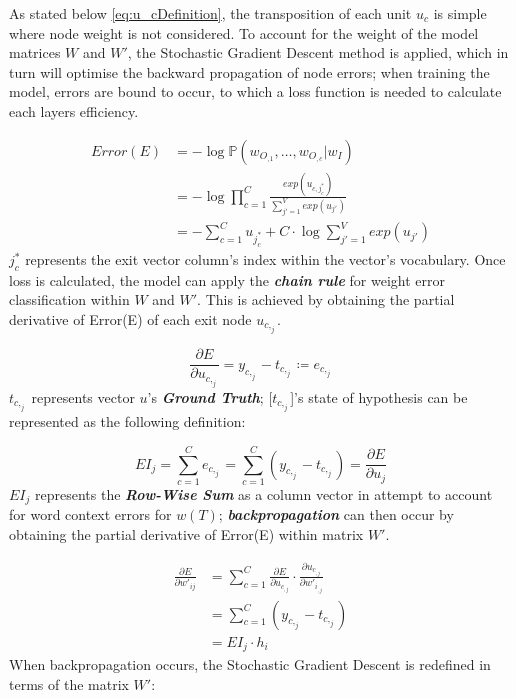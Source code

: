 As stated below \autoref{eq:u_cDefinition}, the transposition of each unit $u_{c}$ is simple where node weight is not considered. To account for the weight of the model matrices $W$ and $W'$, the Stochastic Gradient Descent method is applied, which in turn will optimise the backward propagation of node errors; when training the model, errors are bound to occur, to which a loss function is needed to calculate each layers efficiency.

\begin{equation}
    \begin{split}
        Error (E) & = - \log \mathbb{P} (w_{O_,{_1}} , \ldots, w_{O_{,c}} | w_{I}) \\
                  & = - \log \prod_{c=1}^{C} \frac{exp(u_{c,j_{c}^{*}})}{\sum_{j'=1}^{V} exp(u_{j'})}  \\
                  & = - \sum_{c=1}^{C} u_{j_{c}^{*}} + C \cdot \log \sum_{j'=1} ^ {V} exp(u_{j'})
    \end{split}
\end{equation}
${j_{c}^{*}}$ represents the exit vector column's index within the vector's vocabulary. Once loss is calculated, the model can apply the \textbf{\textit{chain rule}} for weight error classification within $W$ and $W'$. This is achieved by obtaining the partial derivative of Error(E) of each exit node $u_{c,_j}$.

\begin{equation}
    \frac{\partial E}{\partial u_{c,_j}} = y_{c,_j} - t_{c,_j} \coloneqq e_{c,_j}
\end{equation}
$t_{c,_j}$ represents vector $u$'s \textbf{\textit{Ground Truth}}; [$t_{c,_j}$]'s state of hypothesis can be represented as the following definition:

\begin{equation}
    EI_j = \sum_{c=1}^{C} e_{c,_j} = \sum_{c=1}^{C} (y_{c,_j} - t_{c,_j}) = \frac{\partial E}{\partial u_{j}}
\end{equation}
$EI_{j}$ represents the \textbf{\textit{Row-Wise Sum}} as a column vector in attempt to account for word context errors for $w(T)$; \textbf{\textit{backpropagation}} can then occur by obtaining the partial derivative of Error(E) within matrix $W'$.

\begin{equation} \label{}
    \begin{split}
        \frac{\partial E}{\partial w'_{ij}} & = \sum_{c=1}^{C} \frac{\partial E}{\partial u_{c_{,j}}} \cdot \frac{\partial u_{c_{,j}}}{\partial w'_{i_{,j}}} \\
                                            & = \sum_{c=1}^{C} (y_{c,_j} - t_{c,_j}) \\
                                            & = EI_{j} \cdot h_{i}
    \end{split}
\end{equation}
When backpropagation occurs, the Stochastic Gradient Descent is redefined in terms of the matrix $W'$:

